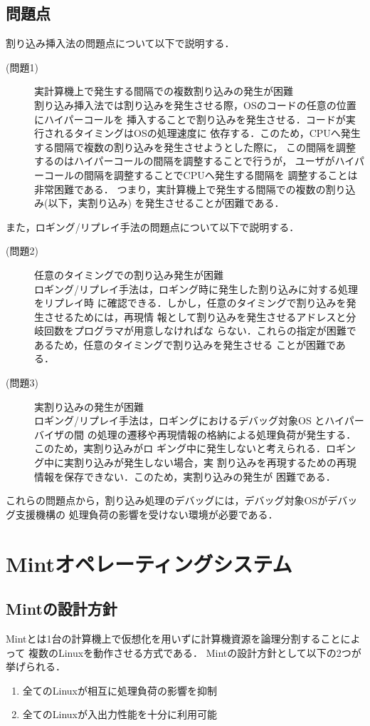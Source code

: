 \documentclass[tanilab-enum]{graduate}
\begin{document}
\section{問題点}\label{mondai}
割り込み挿入法の問題点について以下で説明する．
\begin{description}
    \item[(問題1)]実計算機上で発生する間隔での複数割り込みの発生が困難\\
        割り込み挿入法では割り込みを発生させる際，OSのコードの任意の位置にハイパーコールを
        挿入することで割り込みを発生させる．コードが実行されるタイミングはOSの処理速度に
        依存する．このため，CPUへ発生する間隔で複数の割り込みを発生させようとした際に，
        この間隔を調整するのはハイパーコールの間隔を調整することで行うが，
        ユーザがハイパーコールの間隔を調整することでCPUへ発生する間隔を
        調整することは非常困難である．
        つまり，実計算機上で発生する間隔での複数の割り込み(以下，実割り込み)
        を発生させることが困難である．
\end{description}
また，ロギング/リプレイ手法の問題点について以下で説明する．
\begin{description}
    \item[(問題2)]任意のタイミングでの割り込み発生が困難\\
        ロギング/リプレイ手法は，ロギング時に発生した割り込みに対する処理をリプレイ時
        に確認できる．しかし，任意のタイミングで割り込みを発生させるためには，再現情
        報として割り込みを発生させるアドレスと分岐回数をプログラマが用意しなければな
        らない．これらの指定が困難であるため，任意のタイミングで割り込みを発生させる
        ことが困難である．
    \item[(問題3)]実割り込みの発生が困難\\
        ロギング/リプレイ手法は，ロギングにおけるデバッグ対象OS とハイパーバイザの間
        の処理の遷移や再現情報の格納による処理負荷が発生する．このため，実割り込みがロ
        ギング中に発生しないと考えられる．ロギング中に実割り込みが発生しない場合，実
        割り込みを再現するための再現情報を保存できない．このため，実割り込みの発生が
        困難である．
\end{description}
これらの問題点から，割り込み処理のデバッグには，デバッグ対象OSがデバッグ支援機構の
処理負荷の影響を受けない環境が必要である．
\chapter{Mintオペレーティングシステム}\label{chap:Mint}
\section{Mintの設計方針}
Mintとは1台の計算機上で仮想化を用いずに計算機資源を論理分割することによって
複数のLinuxを動作させる方式である．
Mintの設計方針として以下の2つが挙げられる．
\begin{enumerate}
    \item 全てのLinuxが相互に処理負荷の影響を抑制
    \item 全てのLinuxが入出力性能を十分に利用可能
\end{enumerate}
\end{document}
